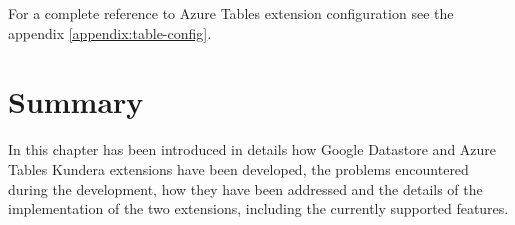 \newparagraph For a complete reference to Azure Tables extension configuration see the appendix \ref{appendix:table-config}.

\section{Summary}
In this chapter has been introduced in details how Google Datastore and Azure Tables Kundera extensions have been developed, the problems encountered during the development, how they have been addressed and the details of the implementation of the two extensions, including the currently supported features.

